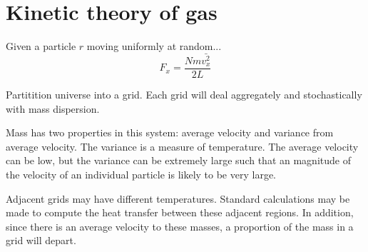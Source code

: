 \documentclass[ ../main.tex]{subfiles}
\begin{document}
\section{Kinetic theory of gas}





Given a particle $r$ moving uniformly at random...
\begin{equation}
    F_x = \frac{N m \bar{v_x^2}}{2 L}
\end{equation}




Partitition universe into a grid. Each grid will deal aggregately and stochastically with mass dispersion.

Mass has two properties in this system: average velocity and variance from average velocity. The variance is a measure of temperature. The average velocity can be low, but the variance can be extremely large such that an magnitude of the velocity of an individual particle is likely to be very large.

Adjacent grids may have different temperatures. Standard calculations may be made to compute the heat transfer between these adjacent regions. In addition, since there is an average velocity to these masses, a proportion of the mass in a grid will depart. 
\end{document}
